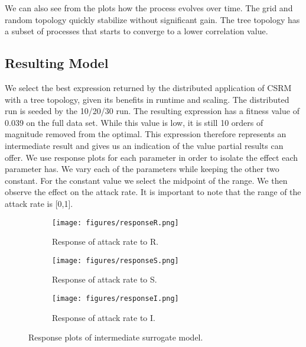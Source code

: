 We can also see from the plots how the process evolves over time. The grid and random topology quickly stabilize without significant gain. The tree topology has a subset of processes that starts to converge to a lower correlation value. 

\subsection{Resulting Model}
We select the best expression returned by the distributed application of CSRM with a tree topology, given its benefits in runtime and scaling. The distributed run is seeded by the 10/20/30 run. The resulting expression has a fitness value of 0.039 on the full data set. While this value is low, it is still 10 orders of magnitude removed from the optimal. This expression therefore represents an intermediate result and gives us an indication of the value partial results can offer.
We use response plots for each parameter in order to isolate the effect each parameter has. We vary each of the parameters while keeping the other two constant. For the constant value we select the midpoint of the range. We then observe the effect on the attack rate. It is important to note that the range of the attack rate is [0,1]. 
\begin{figure}
    \begin{subfigure}{0.9\textwidth}
        \texttt{[image: figures/responseR.png]}
        \caption{Response of attack rate to R.}
    \end{subfigure}
    \begin{subfigure}{0.9\textwidth}
        \texttt{[image: figures/responseS.png]}
        \caption{Response of attack rate to S.}
    \end{subfigure}
        \begin{subfigure}{0.9\textwidth}
        \texttt{[image: figures/responseI.png]}
        \caption{Response of attack rate to I.}
    \end{subfigure}
    \caption{Response plots of intermediate surrogate model.}
    \label{fig:usecaseresponseplots}
\end{figure}

